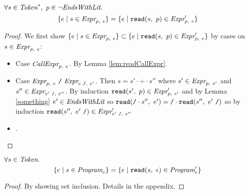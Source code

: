 \documentclass[preprint,10pt]{sigplanconf}
\begin{document}
\begin{lemma}
  \( \forall s \in \textit{Token}^{*},~p \in \neg \textit{EndsWithLit}. \)
  \[
  \{ e \mid s \in \textit{Expr}_{p,~e} \}
  =
  \{ e \mid \texttt{read}(s,~p) \in \textit{Expr}_{p,~e}' \}
  \]
\end{lemma}
\begin{proof}
  We first show 
  \( \{ e \mid s \in \textit{Expr}_{p,~e} \} \subset
  \{ e \mid \texttt{read}(s,~p) \in \textit{Expr}_{p,~e}' \}
  \)
  by cases on \( s \in \textit{Expr}_{p,~e} \):
  \begin{itemize}
  \item Case \( \textit{CallExpr}_{p,~e} \). By Lemma \ref{lem:readCallExpr}.

  \item Case \( \textit{Expr}_{p,~e} ~\texttt{/}~ \textit{Expr}_{e~\texttt{/},~e'} \). 
    Then \( s = s' \cdot \div \cdot s'' \) where \( s' \in
    \textit{Expr}_{p,~e'} \) and \( s'' \in \textit{Expr}_{e'~\texttt{/},~e''}
    \). By induction \( \texttt{read}(s',~p) \in \textit{Expr}_{p,~e'}' \) and
    by Lemma \ref{something} \( e' \in \textit{EndsWithLit} \) so \( \texttt{read}(\texttt{/}
      \cdot s'',~e') = \texttt{/} \cdot \texttt{read}(s'',~e'~\texttt{/}) \) so by
    induction \( \texttt{read}(s'',~e'~\texttt{/}) \in \textit{Expr}_{e'~\texttt{/},~e''}' \)
  \item .
  \end{itemize}
\end{proof}

\begin{theorem}\mbox{}

  \( \forall s \in \textit{Token}. \)
  \[
  \{ e \mid s \in \textit{Program}_{e} \}
  =
  \{ e \mid \texttt{read}(s,~\epsilon) \in \textit{Program}_{e}' \}
  \]
\end{theorem}
\begin{proof}\mbox{}
  
By showing set inclusion. Details in the appendix.
\end{proof}
\end{document}
